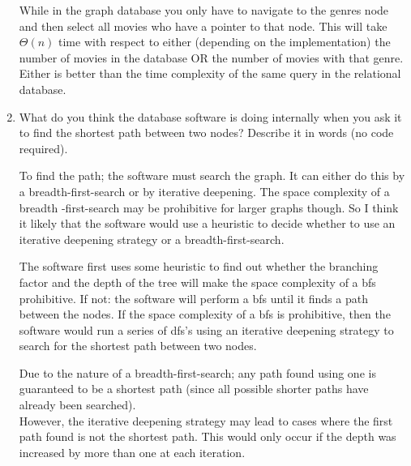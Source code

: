 \documentclass[10pt,\jkfside,a4paper]{article}
\begin{document}
\begin{enumerate}
While in the graph database you only have to navigate to the genres node and 
then select all movies who have a pointer to that node. This will take 
$\Theta(n)$ time with respect to either (depending on the implementation) 
the number of movies in the database OR the number of movies with that genre. 
Either is better than the time complexity of the same query in the relational 
database.

\item{What do you think the database software is doing internally when you 
ask it to find the shortest path between two nodes? Describe it in words 
(no code required).}

To find the path; the software must search the graph. It can either do this by 
a breadth-first-search or by iterative deepening. The space complexity of a breadth
-first-search may be prohibitive for larger graphs though. So I think it likely 
that the software would use a heuristic to decide whether to use an iterative 
deepening strategy or a breadth-first-search.

The software first uses some heuristic to find out whether the branching factor 
and the depth of the tree will make the space complexity of a bfs prohibitive. 
If not: the software will perform a bfs until it finds a path between the nodes.
If the space complexity of a bfs is prohibitive, then the software would 
run a series of dfs's using an iterative deepening strategy to search for the 
shortest path between two nodes.

Due to the nature of a breadth-first-search; any path found using one is guaranteed 
to be a shortest path (since all possible shorter paths have already been searched).\\
However, the iterative deepening strategy may lead to cases where the first path found 
is not the shortest path. This would only occur if the depth was increased by more than 
one at each iteration.

\end{enumerate}
\end{document}
